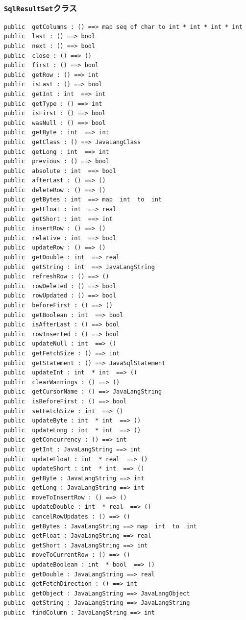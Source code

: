 \documentclass[\pformat,12pt]{jarticle}
\begin{document}
\subsubsection{\texttt{SqlResultSet}クラス}
\begin{small}
\begin{verbatim}
public  getColumns : () ==> map seq of char to int * int * int * int
public  last : () ==> bool
public  next : () ==> bool
public  close : () ==> ()
public  first : () ==> bool
public  getRow : () ==> int
public  isLast : () ==> bool
public  getInt : int  ==> int
public  getType : () ==> int
public  isFirst : () ==> bool
public  wasNull : () ==> bool
public  getByte : int  ==> int
public  getClass : () ==> JavaLangClass
public  getLong : int  ==> int
public  previous : () ==> bool
public  absolute : int  ==> bool
public  afterLast : () ==> ()
public  deleteRow : () ==> ()
public  getBytes : int  ==> map  int  to  int
public  getFloat : int  ==> real
public  getShort : int  ==> int
public  insertRow : () ==> ()
public  relative : int  ==> bool
public  updateRow : () ==> ()
public  getDouble : int  ==> real
public  getString : int  ==> JavaLangString
public  refreshRow : () ==> ()
public  rowDeleted : () ==> bool
public  rowUpdated : () ==> bool
public  beforeFirst : () ==> ()
public  getBoolean : int  ==> bool
public  isAfterLast : () ==> bool
public  rowInserted : () ==> bool
public  updateNull : int  ==> ()
public  getFetchSize : () ==> int
public  getStatement : () ==> JavaSqlStatement
public  updateInt : int  * int  ==> ()
public  clearWarnings : () ==> ()
public  getCursorName : () ==> JavaLangString
public  isBeforeFirst : () ==> bool
public  setFetchSize : int  ==> ()
public  updateByte : int  * int  ==> ()
public  updateLong : int  * int  ==> ()
public  getConcurrency : () ==> int
public  getInt : JavaLangString ==> int
public  updateFloat : int  * real  ==> ()
public  updateShort : int  * int  ==> ()
public  getByte : JavaLangString ==> int
public  getLong : JavaLangString ==> int
public  moveToInsertRow : () ==> ()
public  updateDouble : int  * real  ==> ()
public  cancelRowUpdates : () ==> ()
public  getBytes : JavaLangString ==> map  int  to  int
public  getFloat : JavaLangString ==> real
public  getShort : JavaLangString ==> int
public  moveToCurrentRow : () ==> ()
public  updateBoolean : int  * bool  ==> ()
public  getDouble : JavaLangString ==> real
public  getFetchDirection : () ==> int
public  getObject : JavaLangString ==> JavaLangObject
public  getString : JavaLangString ==> JavaLangString
public  findColumn : JavaLangString ==> int

\end{verbatim}
\end{small}
\end{document}

